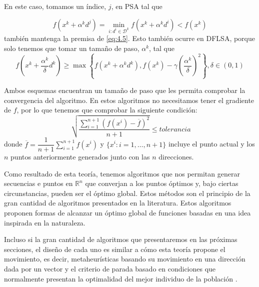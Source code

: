 En este caso, tomamos un índice, $j$, en PSA tal que 

\begin{equation*}
f(x^k+\alpha^kd^j) = \min_{i:d^i\in\mathcal{D}^k} f(x^k+\alpha^kd^i) < f(x^k)
\end{equation*}
también mantenga la premisa de \ref{eq:4.5}. 
Esto también ocurre en DFLSA, porque solo tenemos que tomar un tamaño de paso, $\alpha^k$, tal que
\begin{equation*}
f\left(x^k+\dfrac{\alpha^k}{\delta}d^k\right) \geq \max\left\lbrace f(x^k+\alpha^kd^k), f(x^k)-\gamma\left(\dfrac{\alpha^k}{\delta}\right)^2\right\rbrace, \delta\in(0,1)
\end{equation*}

Ambos esquemas encuentran un tamaño de paso que les permita comprobar la convergencia del algoritmo. 
En estos algoritmos no necesitamos tener el gradiente de $f$, por lo que tenemos que comprobar la siguiente condición:
\begin{equation}
\sqrt[]{\dfrac{\sum_{i=1}^{n+1} (f(x^i)-\overline{f})^2}{n+1}} \leq tolerancia
\label{eq:4.33}
\end{equation}
donde $\overline{f} = \dfrac{1}{n+1}\sum_{i=1}^{n+1}f(x^i)$ y $\{x^i : i=1,\dots,n+1\}$ incluye el punto actual y los $n$ puntos anteriormente generados junto con las $n$ direcciones. 

Como resultado de esta teoría, tenemos algoritmos que nos permitan generar secuencias e puntos en $\mathbb{R}^n$ que converjan a los puntos óptimos y, bajo ciertas circunstancias, pueden ser el óptimo global. 
Estos métodos son el principio de la gran cantidad de algoritmos presentados en la literatura. 
Estos algoritmos proponen formas de alcanzar un óptimo global  de funciones basadas en una idea inspirada en la naturaleza. 

Incluso si la gran cantidad de algoritmos que presentaremos en las próximas secciones, el diseño de cada uno es similar a cómo esta teoría propone el movimiento, es decir, metaheurísticas basando su movimiento en una dirección dada por un vector y el criterio de parada basado en condiciones que normalmente presentan la optimalidad del mejor individuo de la población .